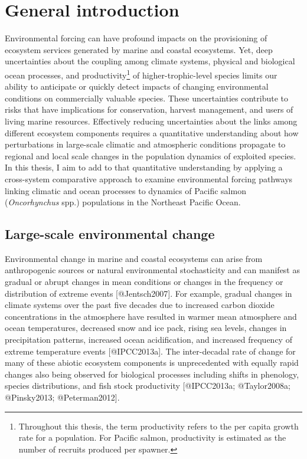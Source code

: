 \chapter{General introduction}\label{general-introduction}

Environmental forcing can have profound impacts on the provisioning of
ecosystem services generated by marine and coastal ecosystems. Yet, deep
uncertainties about the coupling among climate systems, physical and
biological ocean processes, and productivity\footnote{Throughout this
  thesis, the term productivity refers to the per capita growth rate for
  a population. For Pacific salmon, productivity is estimated as the
  number of recruits produced per spawner.} of higher-trophic-level
species limits our ability to anticipate or quickly detect impacts of
changing environmental conditions on commercially valuable species.
These uncertainties contribute to risks that have implications for
conservation, harvest management, and users of living marine resources.
Effectively reducing uncertainties about the links among different
ecosystem components requires a quantitative understanding about how
perturbations in large-scale climatic and atmospheric conditions
propagate to regional and local scale changes in the population dynamics
of exploited species. In this thesis, I aim to add to that quantitative
understanding by applying a cross-system comparative approach to examine
environmental forcing pathways linking climatic and ocean processes to
dynamics of Pacific salmon (\emph{Oncorhynchus} spp.) populations in the
Northeast Pacific Ocean.

\section{Large-scale environmental
change}\label{large-scale-environmental-change}

Environmental change in marine and coastal ecosystems can arise from
anthropogenic sources or natural environmental stochasticity and can
manifest as gradual or abrupt changes in mean conditions or changes in
the frequency or distribution of extreme events {[}@Jentsch2007{]}. For
example, gradual changes in climate systems over the past five decades
due to increased carbon dioxide concentrations in the atmosphere have
resulted in warmer mean atmosphere and ocean temperatures, decreased
snow and ice pack, rising sea levels, changes in precipitation patterns,
increased ocean acidification, and increased frequency of extreme
temperature events {[}@IPCC2013a{]}. The inter-decadal rate of change
for many of these abiotic ecosystem components is unprecedented with
equally rapid changes also being observed for biological processes
including shifts in phenology, species distributions, and fish stock
productivity {[}@IPCC2013a; @Taylor2008a; @Pinsky2013; @Peterman2012{]}.


